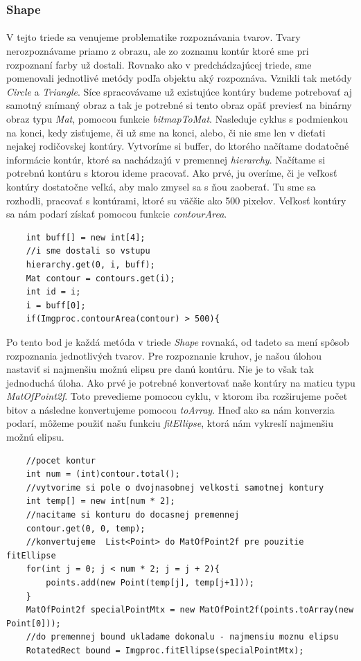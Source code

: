 \documentclass[12pt]{article}
\begin{document}
\subsubsection{Shape}
\paragraph{}
V tejto triede sa venujeme problematike rozpoznávania tvarov. Tvary nerozpoznávame priamo z obrazu, ale zo zoznamu kontúr ktoré sme pri rozpoznaní farby už dostali.
Rovnako ako v predchádzajúcej triede, sme pomenovali jednotlivé metódy podľa objektu aký rozpoznáva. Vznikli tak metódy \emph{Circle} a \emph{Triangle}.
Síce spracovávame už existujúce kontúry budeme potrebovať aj samotný snímaný obraz a tak je potrebné si tento obraz opäť previesť na binárny obraz typu \emph{Mat}, pomocou funkcie \emph{bitmapToMat}.
Nasleduje cyklus s podmienkou na konci, kedy zisťujeme, či už sme na konci, alebo, či nie sme len v dieťati nejakej rodičovskej kontúry. Vytvoríme si buffer, do ktorého načítame dodatočné informácie kontúr, ktoré sa nachádzajú v premennej \emph{hierarchy}.
Načítame si potrebnú kontúru s ktorou ideme pracovať. Ako prvé, ju overíme, či je veľkosť kontúry dostatočne veľká, aby malo zmysel sa s ňou zaoberať. Tu sme sa rozhodli, pracovať s kontúrami, ktoré su väčšie ako 500 pixelov.
Veľkosť kontúry sa nám podarí získať pomocou funkcie \emph{contourArea}.
\begin{lstlisting}
	int buff[] = new int[4];
	//i sme dostali so vstupu
	hierarchy.get(0, i, buff);
	Mat contour = contours.get(i);
	int id = i;
	i = buff[0];
	if(Imgproc.contourArea(contour) > 500){
\end{lstlisting}
Po tento bod je každá metóda v triede \emph{Shape} rovnaká, od tadeto sa mení spôsob rozpoznania jednotlivých tvarov. 
Pre rozpoznanie kruhov, je našou úlohou nastaviť si najmenšiu možnú elipsu pre danú kontúru.
Nie je to však tak jednoduchá úloha. Ako prvé je potrebné konvertovať naše kontúry na maticu typu \emph{MatOfPoint2f}.
Toto prevedieme pomocou cyklu, v ktorom iba rozširujeme počet bitov a následne konvertujeme pomocou \emph{toArray}.
Hneď ako sa nám konverzia podarí, môžeme použiť našu funkciu \emph{fitEllipse}, ktorá nám vykreslí najmenšiu možnú elipsu.
\begin{lstlisting}
	//pocet kontur
	int num = (int)contour.total();
	//vytvorime si pole o dvojnasobnej velkosti samotnej kontury
	int temp[] = new int[num * 2];
	//nacitame si konturu do docasnej premennej
	contour.get(0, 0, temp);
	//konvertujeme  List<Point> do MatOfPoint2f pre pouzitie fitEllipse
	for(int j = 0; j < num * 2; j = j + 2){
		points.add(new Point(temp[j], temp[j+1]));
	}
	MatOfPoint2f specialPointMtx = new MatOfPoint2f(points.toArray(new Point[0])); 
	//do premennej bound ukladame dokonalu - najmensiu moznu elipsu
	RotatedRect bound = Imgproc.fitEllipse(specialPointMtx);
\end{lstlisting}
\end{document}
